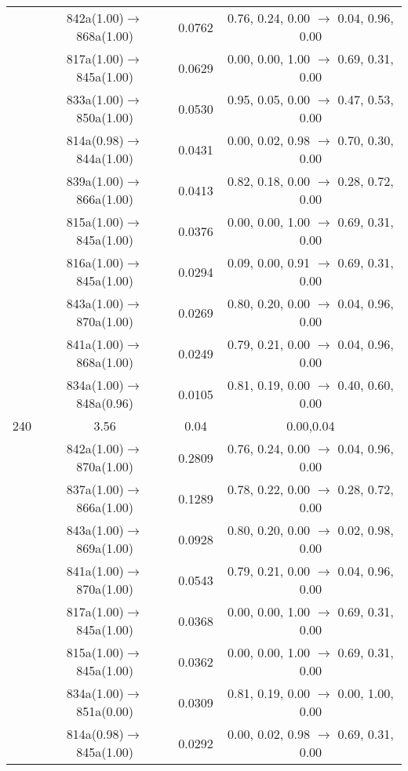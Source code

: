 \documentclass[10pt,a4paper]{article}
\begin{document}
\begin{longtable}{c|c|c|c}
 	& 842a(1.00)$\rightarrow$868a(1.00) &	 0.0762 &	 0.76, 0.24, 0.00 $\rightarrow$ 0.04, 0.96, 0.00 \\ 
 	& 817a(1.00)$\rightarrow$845a(1.00) &	 0.0629 &	 0.00, 0.00, 1.00 $\rightarrow$ 0.69, 0.31, 0.00 \\ 
 	& 833a(1.00)$\rightarrow$850a(1.00) &	 0.0530 &	 0.95, 0.05, 0.00 $\rightarrow$ 0.47, 0.53, 0.00 \\ 
 	& 814a(0.98)$\rightarrow$844a(1.00) &	 0.0431 &	 0.00, 0.02, 0.98 $\rightarrow$ 0.70, 0.30, 0.00 \\ 
 	& 839a(1.00)$\rightarrow$866a(1.00) &	 0.0413 &	 0.82, 0.18, 0.00 $\rightarrow$ 0.28, 0.72, 0.00 \\ 
 	& 815a(1.00)$\rightarrow$845a(1.00) &	 0.0376 &	 0.00, 0.00, 1.00 $\rightarrow$ 0.69, 0.31, 0.00 \\ 
 	& 816a(1.00)$\rightarrow$845a(1.00) &	 0.0294 &	 0.09, 0.00, 0.91 $\rightarrow$ 0.69, 0.31, 0.00 \\ 
 	& 843a(1.00)$\rightarrow$870a(1.00) &	 0.0269 &	 0.80, 0.20, 0.00 $\rightarrow$ 0.04, 0.96, 0.00 \\ 
 	& 841a(1.00)$\rightarrow$868a(1.00) &	 0.0249 &	 0.79, 0.21, 0.00 $\rightarrow$ 0.04, 0.96, 0.00 \\ 
 	& 834a(1.00)$\rightarrow$848a(0.96) &	 0.0105 &	 0.81, 0.19, 0.00 $\rightarrow$ 0.40, 0.60, 0.00 \\ 
 \hline240 &	 3.56 &	 0.04 &	 0.00,0.04 \\ 
  	& 842a(1.00)$\rightarrow$870a(1.00) &	 0.2809 &	 0.76, 0.24, 0.00 $\rightarrow$ 0.04, 0.96, 0.00 \\ 
 	& 837a(1.00)$\rightarrow$866a(1.00) &	 0.1289 &	 0.78, 0.22, 0.00 $\rightarrow$ 0.28, 0.72, 0.00 \\ 
 	& 843a(1.00)$\rightarrow$869a(1.00) &	 0.0928 &	 0.80, 0.20, 0.00 $\rightarrow$ 0.02, 0.98, 0.00 \\ 
 	& 841a(1.00)$\rightarrow$870a(1.00) &	 0.0543 &	 0.79, 0.21, 0.00 $\rightarrow$ 0.04, 0.96, 0.00 \\ 
 	& 817a(1.00)$\rightarrow$845a(1.00) &	 0.0368 &	 0.00, 0.00, 1.00 $\rightarrow$ 0.69, 0.31, 0.00 \\ 
 	& 815a(1.00)$\rightarrow$845a(1.00) &	 0.0362 &	 0.00, 0.00, 1.00 $\rightarrow$ 0.69, 0.31, 0.00 \\ 
 	& 834a(1.00)$\rightarrow$851a(0.00) &	 0.0309 &	 0.81, 0.19, 0.00 $\rightarrow$ 0.00, 1.00, 0.00 \\ 
 	& 814a(0.98)$\rightarrow$845a(1.00) &	 0.0292 &	 0.00, 0.02, 0.98 $\rightarrow$ 0.69, 0.31, 0.00 \\ 

\end{longtable}
\end{document}
